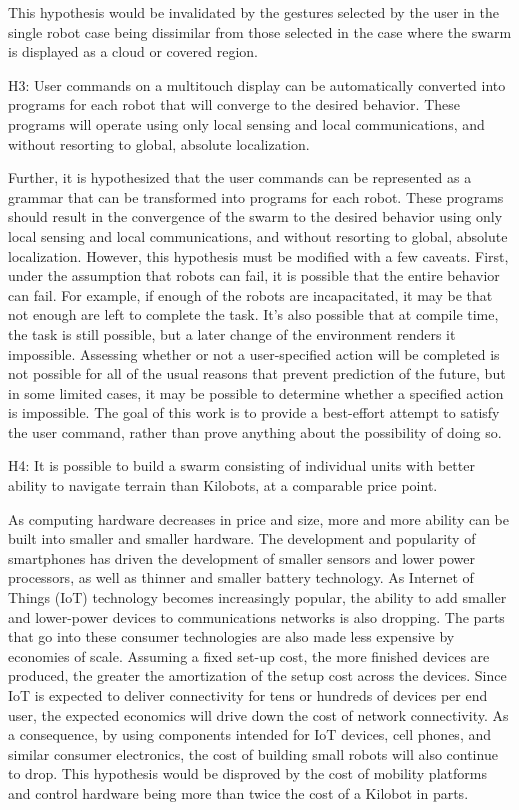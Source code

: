 This hypothesis would be invalidated by the gestures selected by the user in the single robot case being dissimilar from those selected in the case where the swarm is displayed as a cloud or covered region. 

H3: User commands on a multitouch display can be automatically converted into programs for each robot that will converge to the desired behavior. These programs will operate using only local sensing and local communications, and without resorting to global, absolute localization. 

Further, it is hypothesized that the user commands can be represented as a grammar that can be transformed into programs for each robot. 
These programs should result in the convergence of the swarm to the desired behavior using only local sensing and local communications, and without resorting to global, absolute localization. 
However, this hypothesis must be modified with a few caveats. 
First, under the assumption that robots can fail, it is possible that the entire behavior can fail. 
For example, if enough of the robots are incapacitated, it may be that not enough are left to complete the task. 
It's also possible that at compile time, the task is still possible, but a later change of the environment renders it impossible. 
Assessing whether or not a user-specified action will be completed is not possible for all of the usual reasons that prevent prediction of the future, but in some limited cases, it may be possible to determine whether a specified action is impossible. The goal of this work is to provide a best-effort attempt to satisfy the user command, rather than prove anything about the possibility of doing so. 

H4: It is possible to build a swarm consisting of individual units with better ability to navigate terrain than Kilobots, at a comparable price point. 

As computing hardware decreases in price and size, more and more ability can be built into smaller and smaller hardware. 
The development and popularity of smartphones has driven the development of smaller sensors and lower power processors, as well as thinner and smaller battery technology. 
As Internet of Things (IoT) technology becomes increasingly popular, the ability to add smaller and lower-power devices to communications networks is also dropping. 
The parts that go into these consumer technologies are also made less expensive by economies of scale. 
Assuming a fixed set-up cost, the more finished devices are produced, the greater the amortization of the setup cost across the devices. 
Since IoT is expected to deliver connectivity for tens or hundreds of devices per end user, the expected economics will drive down the cost of network connectivity.
As a consequence, by using components intended for IoT devices, cell phones, and similar consumer electronics, the cost of building small robots will also continue to drop.
This hypothesis would be disproved by the cost of mobility platforms and control hardware being more than twice the cost of a Kilobot in parts. 
